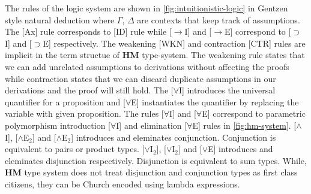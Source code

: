 The rules of the logic system are shown in \cref{fig:intuitionistic-logic} in Gentzen style natural deduction
where $\Gamma$, $\Delta$ are contexts that keep track of assumptions. The [Ax] rule corresponds to [ID] rule while [$\rightarrow$I] and [$\rightarrow$E] correspond
to [$\supset$I] and [$\supset$E] respectively. The weakening [WKN] and contraction [CTR] rules are implicit in the term structue of \textbf{HM} type-system.
The weakening rule states that we can add unrelated assumptions to derivations without
affecting the proofs while contraction states that we can discard duplicate assumptions in our derivations and the
proof will still hold. The [$\forall$I] introduces the universal quantifier for a proposition and [$\forall$E] instantiates
the quantifier by replacing the variable with given proposition. The rules [$\forall$I] and [$\forall$E] correspond to parametric polymorphism
introduction [$\forall$I] and elimination [$\forall$E] rules in \cref{fig:hm-system}. [$\wedge$I], [$\wedge$E$_2$] and [$\wedge$E$_2$] introduces and eleminates
conjunction. Conjunction is equivalent to pairs or product types. [$\vee$I$_2$], [$\vee$I$_2$] and [$\vee$E] introduces and eleminates disjunction respectively.
Disjunction is equivalent to sum types. While, \textbf{HM} type system does not treat disjunction and conjunction types as first class citizens,
they can be Church encoded using lambda expressions\citep{pierce_tapl_2005}.

